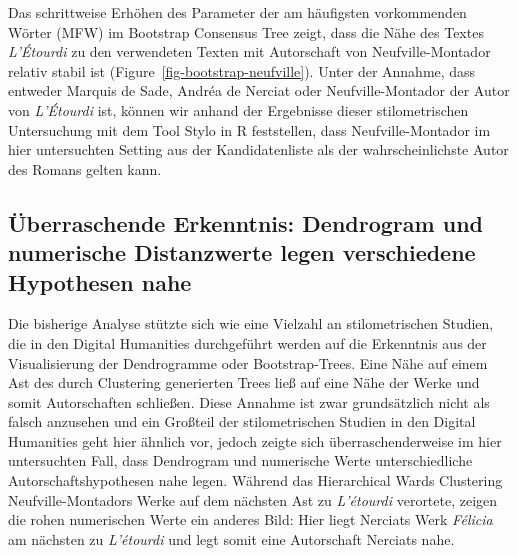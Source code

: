 \documentclass[
  12pt,
  letterpaper,
]{classicthesis}
\begin{document}
Das schrittweise Erhöhen des Parameter der am häufigsten vorkommenden
Wörter (MFW) im Bootstrap Consensus Tree zeigt, dass die Nähe des Textes
\emph{L'Étourdi} zu den verwendeten Texten mit Autorschaft von
Neufville-Montador relativ stabil ist
(Figure~\ref{fig-bootstrap-neufville}). Unter der Annahme, dass entweder
Marquis de Sade, Andréa de Nerciat oder Neufville-Montador der Autor von
\emph{L'Étourdi} ist, können wir anhand der Ergebnisse dieser
stilometrischen Untersuchung mit dem Tool Stylo in R feststellen, dass
Neufville-Montador im hier untersuchten Setting aus der Kandidatenliste
als der wahrscheinlichste Autor des Romans gelten kann.

\subsection{Überraschende Erkenntnis: Dendrogram und numerische
Distanzwerte legen verschiedene Hypothesen
nahe}\label{uxfcberraschende-erkenntnis-dendrogram-und-numerische-distanzwerte-legen-verschiedene-hypothesen-nahe}

Die bisherige Analyse stützte sich wie eine Vielzahl an stilometrischen
Studien, die in den Digital Humanities durchgeführt werden auf die
Erkenntnis aus der Visualisierung der Dendrogramme oder Bootstrap-Trees.
Eine Nähe auf einem Ast des durch Clustering generierten Trees ließ auf
eine Nähe der Werke und somit Autorschaften schließen. Diese Annahme ist
zwar grundsätzlich nicht als falsch anzusehen und ein Großteil der
stilometrischen Studien in den Digital Humanities geht hier ähnlich vor,
jedoch zeigte sich überraschenderweise im hier untersuchten Fall, dass
Dendrogram und numerische Werte unterschiedliche Autorschaftshypothesen
nahe legen. Während das Hierarchical Wards Clustering
Neufville-Montadors Werke auf dem nächsten Ast zu \emph{L'étourdi}
verortete, zeigen die rohen numerischen Werte ein anderes Bild: Hier
liegt Nerciats Werk \emph{Félicia} am nächsten zu \emph{L'étourdi} und
legt somit eine Autorschaft Nerciats nahe.
\end{document}
